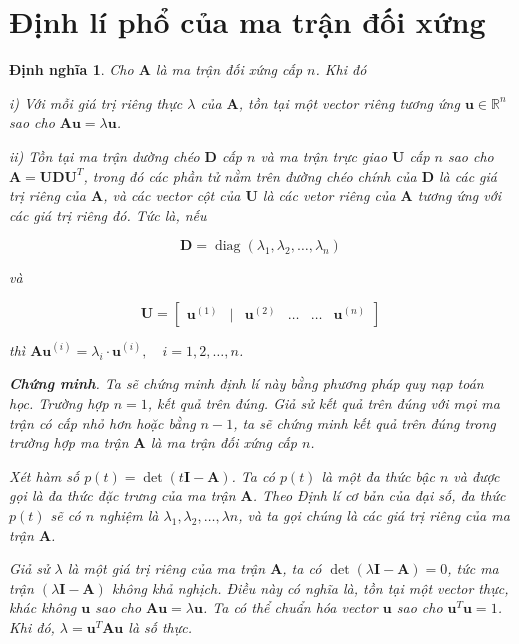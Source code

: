 \documentclass[12pt,a4paper,oneside]{report}
\newtheorem{dn}{Định nghĩa}[section]
\numberwithin{equation}{section}
\begin{document}
\section{Định lí phổ của ma trận đối xứng}
\begin{dn}\rm
	Cho $\mathbf{A}$ là ma trận đối xứng cấp $n$. Khi đó
	
	i) Với mỗi giá trị riêng thực $\lambda$ của $\mathbf{A}$, tồn tại một vector riêng tương ứng $\mathbf{u} \in \mathbb{R}^{n}$ sao cho $\mathbf{A u}=\lambda \mathbf{u}$.
	
	ii) Tồn tại ma trận dường chéo $\mathbf{D}$ cấp $n$ và ma trận trực giao $\mathbf{U}$ cấp $n$ sao cho $\mathbf{A}=\mathbf{U D U}^{T}$, trong đó các phần tử nằm trên đường chéo chính của $\mathbf{D}$ là các giá trị riêng của $\mathbf{A}$, và các vector cột của $\mathbf{U}$ là các vetor riêng của $\mathbf{A}$ tương ứng với các giá trị riêng đó. Tức là, nếu
	
	$$
	\mathbf{D}=\operatorname{diag}\left(\lambda_{1}, \lambda_{2}, \ldots, \lambda_{n}\right)
	$$
	
	và
	
	$$
	\mathbf{U}=\left[\begin{array}{lllllll}
		\mathbf{u}^{(1)} & \mid & \mathbf{u}^{(2)} & \ldots & \ldots & \mathbf{u}^{(n)}
	\end{array}\right]
	$$
	
	thì $\mathbf{A} \mathbf{u}^{(i)}=\lambda_{i} \cdot \mathbf{u}^{(i)}, \quad i=1,2, \ldots, n$.
	
\textbf{	Chứng minh}. Ta sẽ chứng minh định lí này bằng phương pháp quy nạp toán học. Trường hợp $n=1$, kết quả trên đúng. Giả sử kết quả trên đúng với mọi ma trận có cấp nhỏ hơn hoặc bằng $n-1$, ta sẽ chứng minh kết quả trên đúng trong trường hợp ma trận $\mathbf{A}$ là ma trận đối xứng cấp $n$.
	
	Xét hàm số $p(t)=\operatorname{det}(t \mathbf{I}-\mathbf{A})$. Ta có $p(t)$ là một đa thức bậc $n$ và được gọi là đa thức đặc trưng của ma trận $\mathbf{A}$. Theo Định lí cơ bản của đại số, đa thức $p(t)$ sẽ có $n$ nghiệm là $\lambda_{1}, \lambda_{2}, \ldots, \lambda n$, và ta gọi chúng là các giá trị riêng của ma trận $\mathbf{A}$.
	
	Giả sử $\lambda$ là một giá trị riêng của ma trận $\mathbf{A}$, ta có $\operatorname{det}(\lambda \mathbf{I}-\mathbf{A})=0$, tức ma trận $(\lambda \mathbf{I}-\mathbf{A})$ không khả nghịch. Điều này có nghĩa là, tồn tại một vector thực, khác không $\mathbf{u}$ sao cho $\mathbf{A} \mathbf{u}=\lambda \mathbf{u}$. Ta có thể chuẩn hóa vector $\mathbf{u}$ sao cho $\mathbf{u}^{T} \mathbf{u}=1$. Khi đó, $\lambda=\mathbf{u}^{T} \mathbf{A u}$ là số thực.
	

\end{dn}
\end{document}
